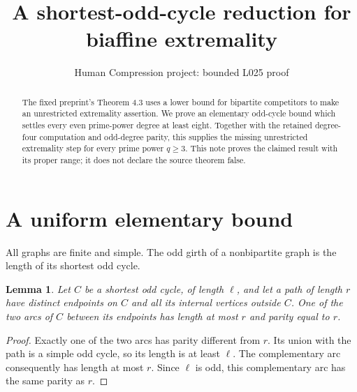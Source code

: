 \documentclass[11pt,a4paper]{article}
\title{A shortest-odd-cycle reduction for biaffine extremality}
\author{Human Compression project: bounded L025 proof}
\date{}
\newtheorem{lemma}{Lemma}
\begin{document}
\maketitle
\begin{abstract}
The fixed preprint's Theorem 4.3 uses a lower bound for bipartite
competitors to make an unrestricted extremality assertion. We prove an
elementary odd-cycle bound which settles every even prime-power degree
at least eight. Together with the retained degree-four computation and
odd-degree parity, this supplies the missing unrestricted extremality
step for every prime power $q\geq3$. This note proves the claimed result
with its proper range; it does not declare the source theorem false.
\end{abstract}

\section{A uniform elementary bound}
All graphs are finite and simple. The odd girth of a nonbipartite graph
is the length of its shortest odd cycle.
\begin{lemma}\label{path}
Let $C$ be a shortest odd cycle, of length $\ell$, and let a path of
length $r$ have distinct endpoints on $C$ and all its internal vertices
outside $C$. One of the two arcs of $C$ between its endpoints has length
at most $r$ and parity equal to $r$.
\end{lemma}
\begin{proof}
Exactly one of the two arcs has parity different from $r$. Its union
with the path is a simple odd cycle, so its length is at least $\ell$.
The complementary arc consequently has length at most $r$. Since
$\ell$ is odd, this complementary arc has the same parity as $r$.
\end{proof}
\end{document}

